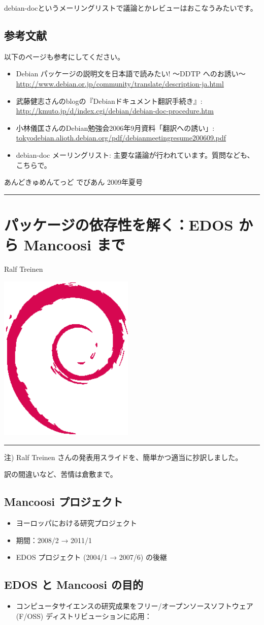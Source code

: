 \documentclass[mingoth,a4paper]{jsarticle}
\renewcommand{\dancersection}[2]{%
\newpage
あんどきゅめんてっど でびあん 2009年夏号
%
\vspace{0.1mm}\\
{\color{dancerlightblue}\rule{\hsize}{2mm}}

%
%
\begin{minipage}[t]{0.6\hsize}
\color{dancerdarkblue}
\vspace{1cm}
\section{#1}
\hfill{}#2\\
\end{minipage}
\begin{minipage}[t]{0.4\hsize}
\vspace{-2cm}
\hfill{}\includegraphics[height=8cm]{image200502/openlogo-nd.eps}\\
\vspace{-5cm}
\end{minipage}
%
%
{\color{dancerdarkblue}\rule{0.74\hsize}{2mm}}
%
\vspace{2cm}
}
\begin{document}
\begin{commandline}
debian-docというメーリングリストで議論とかレビューはおこなうみたいです。

\subsection{参考文献}

以下のページも参考にしてください。

\begin{itemize}
 \item Debian パッケージの説明文を日本語で読みたい! 〜DDTP へのお誘い〜 
       \url{http://www.debian.or.jp/community/translate/description-ja.html}
 \item 武藤健志さんのblogの『Debianドキュメント翻訳手続き』:
       \url{http://kmuto.jp/d/index.cgi/debian/debian-doc-procedure.htm}
 \item 小林儀匡さんのDebian勉強会2006年9月資料「翻訳への誘い」:
       \url{tokyodebian.alioth.debian.org/pdf/debianmeetingresume200609.pdf}
 \item debian-doc メーリングリスト:
       主要な議論が行われています。質問なども、こちらで。
\end{itemize}


\dancersection{パッケージの依存性を解く：EDOS から Mancoosi まで}{Ralf Treinen}


注) Ralf Treinen さんの発表用スライドを、簡単かつ適当に抄訳しました。

訳の間違いなど、苦情は倉敷まで。

\subsection{Mancoosi プロジェクト}

\begin{itemize}
\item ヨーロッパにおける研究プロジェクト
\item 期間：2008/2 → 2011/1
\item EDOS プロジェクト (2004/1 → 2007/6) の後継
\end{itemize}


\subsection{EDOS と Mancoosi の目的}

\begin{itemize}
\item コンピュータサイエンスの研究成果をフリー/オープンソースソフトウェア (F/OSS) ディストリビューションに応用：


\end{itemize}
\end{commandline}
\end{document}
